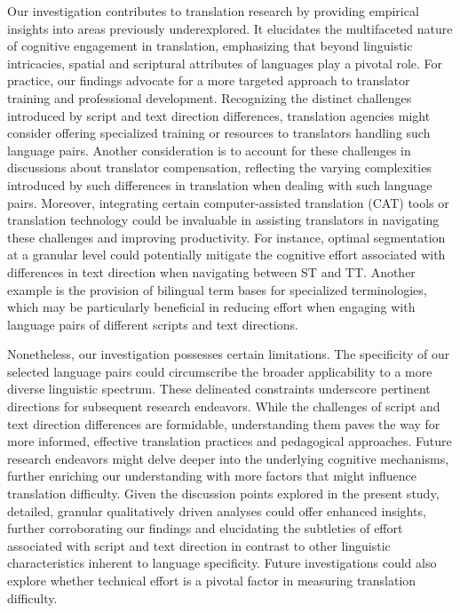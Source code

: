 \documentclass[output=paper]{langscibook}
\begin{document}
Our investigation contributes to translation research by providing empirical insights into areas previously underexplored. It elucidates the multifaceted nature of cognitive engagement in translation, emphasizing that beyond linguistic intricacies, spatial and scriptural attributes of languages play a pivotal role. For practice, our findings advocate for a more targeted approach to translator training and professional development. Recognizing the distinct challenges introduced by script and text direction differences, translation agencies might consider offering specialized training or resources to translators handling such language pairs. Another consideration is to account for these challenges in discussions about translator compensation, reflecting the varying complexities introduced by such differences in translation when dealing with such language pairs. Moreover, integrating certain computer-assisted translation (CAT) tools or translation technology could be invaluable in assisting translators in navigating these challenges and improving productivity. For instance, optimal segmentation at a granular level could potentially mitigate the cognitive effort associated with differences in text direction when navigating between ST and TT. Another example is the provision of bilingual term bases for specialized terminologies, which may be particularly beneficial in reducing effort when engaging with language pairs of different scripts and text directions.

Nonetheless, our investigation possesses certain limitations. The specificity of our selected language pairs could circumscribe the broader applicability to a more diverse linguistic spectrum. These delineated constraints underscore pertinent directions for subsequent research endeavors. While the challenges of script and text direction differences are formidable, understanding them paves the way for more informed, effective translation practices and pedagogical approaches. Future research endeavors might delve deeper into the underlying cognitive mechanisms, further enriching our understanding with more factors that might influence translation difficulty. Given the discussion points explored in the present study, detailed, granular qualitatively driven analyses could offer enhanced insights, further corroborating our findings and elucidating the subtleties of effort associated with script and text direction in contrast to other linguistic characteristics inherent to language specificity. Future investigations could also explore whether technical effort is a pivotal factor in measuring translation difficulty.
\end{document}
